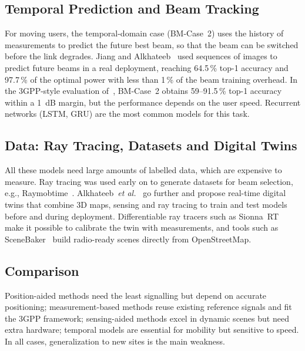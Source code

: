 \documentclass[journal]{IEEEtran}
\begin{document}
\subsection{Temporal Prediction and Beam Tracking}
For moving users, the temporal-domain case (BM-Case~2) uses the history of measurements to predict the future best beam, so that the beam can be switched before the link degrades. Jiang and Alkhateeb~\cite{jiang2022tracking} used sequences of images to predict future beams in a real deployment, reaching 64.5\,\% top-1 accuracy and 97.7\,\% of the optimal power with less than 1\,\% of the beam training overhead. In the 3GPP-style evaluation of~\cite{jayaweera2024bm}, BM-Case~2 obtains 59--91.5\,\% top-1 accuracy within a 1~dB margin, but the performance depends on the user speed. Recurrent networks (LSTM, GRU) are the most common models for this task.

\subsection{Data: Ray Tracing, Datasets and Digital Twins}
All these models need large amounts of labelled data, which are expensive to measure. Ray tracing was used early on to generate datasets for beam selection, e.g., Raymobtime~\cite{klautau2018data}. Alkhateeb~\emph{et al.}~\cite{alkhateeb2023twins} go further and propose real-time digital twins that combine 3D maps, sensing and ray tracing to train and test models before and during deployment. Differentiable ray tracers such as Sionna~RT~\cite{hoydis2023sionnart} make it possible to calibrate the twin with measurements, and tools such as SceneBaker~\cite{lyu2026scenebaker} build radio-ready scenes directly from OpenStreetMap.

\subsection{Comparison}
Position-aided methods need the least signalling but depend on accurate positioning; measurement-based methods reuse existing reference signals and fit the 3GPP framework; sensing-aided methods excel in dynamic scenes but need extra hardware; temporal models are essential for mobility but sensitive to speed. In all cases, generalization to new sites is the main weakness.
\end{document}
